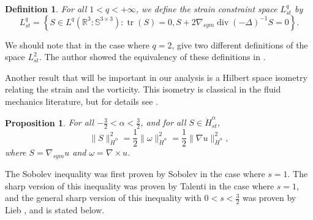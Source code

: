 \documentclass[11pt]{article}
\theoremstyle{plain}
\newtheorem{definition}[theorem]{Definition}
\newtheorem{proposition}[theorem]{Proposition}
\theoremstyle{remark}
\numberwithin{equation}{section}
\DeclareMathOperator*{\tr}{tr}
\DeclareMathOperator*{\divr}{div}
\begin{document}
\begin{definition} \label{StrainDefLq}
For all $1<q<+\infty$, we define the strain constraint space $L^q_{st}$ by
\begin{equation}
    L^q_{st}=\left\{
    S\in L^q\left(\mathbb{R}^3:\mathbb{S}^{3\times 3}\right):
    \tr(S)=0, S+2\nabla_{sym}\divr(-\Delta)^{-1}S=0
    \right\}.
\end{equation}
\end{definition}

We should note that in the case where $q=2$,  give two different definitions of the space $L^2_{st}$.
The author showed the equivalency of these definitions in \cite{MillerStrain}.

Another result that will be important in our analysis is a Hilbert space isometry relating the strain and the vorticity.
This isometry is classical in the fluid mechanics literature, but for details see \cite{MillerStrain}.
\begin{proposition}
For all $-\frac{3}{2}<\alpha<\frac{3}{2}$,
and for all $S\in \dot{H}^\alpha_{st}$,
\begin{equation}
    \|S\|_{\dot{H}^\alpha}^2
    =
    \frac{1}{2}\|\omega\|_{\dot{H}^\alpha}^2
    =
    \frac{1}{2}\|\nabla u\|_{\dot{H}^\alpha}^2,
\end{equation}
where $S=\nabla_{sym} u$ and $\omega=\nabla\times u$.
\end{proposition}

The Sobolev inequality was first proven by Sobolev \cite{Sobolev} in the case where $s=1$.
The sharp version of this inequality was proven by Talenti \cite{Talenti} in the case where $s=1$, and the general sharp version of this inequality with $0<s<\frac{3}{2}$ was proven by Lieb \cite{Lieb}, and is stated below.
\end{document}
